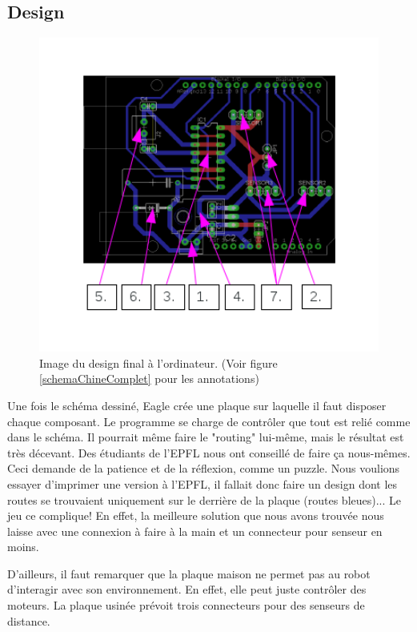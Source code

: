 \documentclass[a4paper,11pt]{report}
\begin{document}
{\subsection{Design}
\begin{figure}[h]
\centering
\includegraphics[width=1\textwidth]{board_CHI_annotated.png}
\caption[Design final du PCB]{\label{BoardChine}Image du design final à
  l'ordinateur. (Voir figure \ref{schemaChineComplet} pour les annotations)
}
\end{figure}

Une fois le schéma dessiné, Eagle crée une plaque sur laquelle il faut disposer chaque composant. Le programme se charge de contrôler que tout est relié comme dans le schéma. Il pourrait même faire le "routing" lui-même, mais le résultat est très décevant. Des étudiants de l'EPFL nous ont conseillé de faire ça nous-mêmes. Ceci demande de la patience et de la réflexion, comme un puzzle. Nous voulions essayer d'imprimer une version à l'EPFL, il fallait donc faire un design dont les routes se trouvaient uniquement sur le derrière de la plaque (routes bleues)... Le jeu ce complique! En effet, la meilleure solution que nous avons trouvée nous laisse avec une connexion à faire à la main et un connecteur pour senseur en moins.

D'ailleurs, il faut remarquer que la plaque maison ne permet pas au robot d'interagir avec son environnement. En effet, elle peut juste contrôler des moteurs. La plaque usinée prévoit trois connecteurs pour des senseurs de distance.


}
\end{document}
